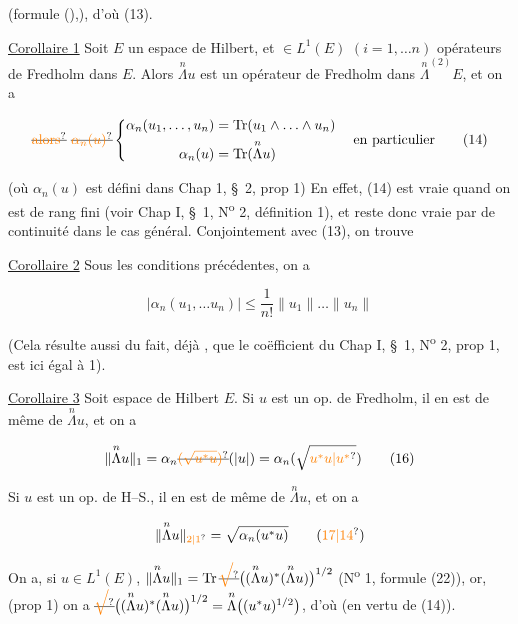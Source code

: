 (formule (),), d'où (13).

\uline{Corollaire 1} Soit $E$ un espace de Hilbert, et  $\in L^1(E)$  $(i=1,\ldots n)$  opérateurs de Fredholm dans $E$. Alors $\overset{n}{\Lambda}u$ est un opérateur de Fredholm dans $\overset{n}{\Lambda}^{(2)}E$, et on a

\[
\deleted{\unsure{\text{alors}}}\ \deleted{\unsure{\alpha_n(u)}}\left\{\begin{aligned}
\alpha_n(u_1,\ldots,u_n)&=\operatorname{Tr}(u_1\wedge\ldots\wedge u_n)\\
\alpha_n(u)&=\operatorname{Tr}(\overset{n}{\Lambda}u)
\end{aligned}\right.\quad\text{en particulier}\tag*{(14)}
\]

(où $\alpha_n(u)$ est défini dans Chap 1, \S~2, prop 1) En effet, (14) est vraie  quand on
est de rang fini  (voir Chap I, \S~1, N\textsuperscript{o} 2, définition 1), et reste donc vraie par  de continuité dans le cas général. Conjointement avec (13), on trouve

\uline{Corollaire 2} Sous les conditions précédentes, on a

\[
|\alpha_n(u_1,\ldots u_n)|\leq\frac1{n!}\lVert u_1\rVert\ldots\lVert u_n\rVert\tag*{(15)}
\]

(Cela résulte aussi du fait, déjà , que le coëfficient  du Chap I, \S~1, N\textsuperscript{o} 2, prop 1, est ici égal à 1).

\uline{Corollaire 3} Soit   espace de Hilbert $E$.  Si $u$ est un op. de Fredholm, il en est de même de $\overset{n}{\Lambda}u$, et on a

\[
\lVert\overset{n}{\Lambda}u\rVert_1=\alpha_n\deleted{\unsure{(\sqrt{u^*u})}}(|u|)=\alpha_n(\sqrt{\unsure{u^*u|u^*}})
\tag*{(16)}
\]

Si $u$ est un op. de H--S., il en est de même de $\overset{n}{\Lambda}u$, et on a

\[
\lVert\overset{n}{\Lambda}u\rVert_{\unsure{2|1}}=\sqrt{\alpha_n(u^*u)}\tag*{(\unsure{17|14})}
\]

On a, si $u\in L^1(E)$, $\lVert\overset{n}{\Lambda}u\rVert_1=\operatorname{Tr}\deleted{\unsure{\sqrt{\vphantom{(\overset{n}{\Lambda}u)^*}}}}\bigl((\overset{n}{\Lambda}u)^*(\overset{n}{\Lambda}u)\bigr)^{1/2}$ (N\textsuperscript{o} 1, formule (22)), or, (prop 1) on a $\deleted{\unsure{\sqrt{\vphantom{(\overset{n}{\Lambda}u)^*}}}}\bigl((\overset{n}{\Lambda}u)^*(\overset{n}{\Lambda}u)\bigr)^{1/2}=\overset{n}{\Lambda}\bigl((u^*u)^{1/2}\bigr)$, d'où   (en vertu de (14)).

